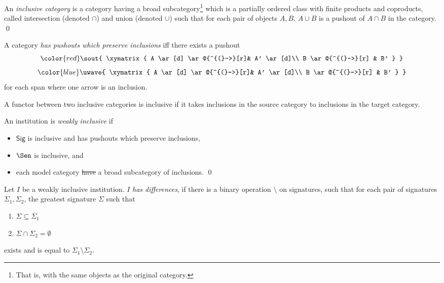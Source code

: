 \documentclass[10pt,fleqn,final]{scrreprt}
\newcommand{\Sig}{\mathsf{Sig}}
\providecommand{\DIFadd}[1]{{\protect\color{blue}\uwave{#1}}} %
\providecommand{\DIFdel}[1]{{\protect\color{red}\sout{#1}}}                      %
\providecommand{\DIFaddbegin}{} %
\providecommand{\DIFaddend}{} %
\providecommand{\DIFdelbegin}{} %
\providecommand{\DIFdelend}{} %
\begin{document}
\begin{definition}  
 An \emph{inclusive category} \cite{DBLP:conf/birthday/GoguenR04} 
 is a category having a broad subcategory\footnote{That is, with the same objects as the original category.}
which is a partially ordered class with 
\DIFaddbegin \DIFadd{a least element (denoted $\emptyset$),
}\DIFaddend finite products and coproducts, called intersection (denoted $\cap$) and union
(denoted $\cup$) such that for each pair of objects $A, B$, $A \cup B$ is a pushout of $A \cap B$ in the category.
\qed \end{definition}

\noindent
A category \emph{has pushouts which preserve inclusions} iff 
there exists a pushout
\DIFdelbegin \begin{displaymath}\DIFdel{
\xymatrix{
  A  \ar[d] \ar@{^{(}->}[r]& A' \ar[d]\\
  B \ar@{^{(}->}[r] & B'
}
}\end{displaymath} %
\DIFdelend %
\DIFaddbegin \begin{equation*}\DIFadd{
\xymatrix{
  A  \ar[d] \ar@{^{(}->}[r]& A' \ar[d]\\
  B \ar@{^{(}->}[r] & B'
}
}\end{equation*}
\DIFaddend for each span where one arrow is an inclusion.

A functor between two inclusive categories is inclusive if it takes inclusions in the source category to inclusions in the target category.

\begin{definition}
An institution is \emph{weakly inclusive} if
\begin{itemize}
  \item $\Sig$ is inclusive and has pushouts which preserve inclusions,
  \item $\Sen$ is inclusive, and
  \item each model category \DIFdelbegin \DIFdel{have }\DIFdelend \DIFaddbegin \DIFadd{has }\DIFaddend a broad subcategory of inclusions.\DIFdelbegin %
\DIFdelend \DIFaddbegin \quad\DIFaddend \qed
\DIFaddbegin \end{itemize}
\DIFaddend \end{definition}

Let $I$ be a weakly inclusive institution.  $I$  \emph{has differences}, if there is a binary operation $\setminus$ on signatures, 
such that for each pair of signatures 
$\Sigma_1, \Sigma_2$, the greatest signature $\Sigma$ such that
\begin{enumerate}
  \item $\Sigma \subseteq \Sigma_1$
  \item $\Sigma \cap \Sigma_2 = \emptyset$
\end{enumerate} 
exists and is equal to $\Sigma_1\setminus \Sigma_2$.
\end{document}
